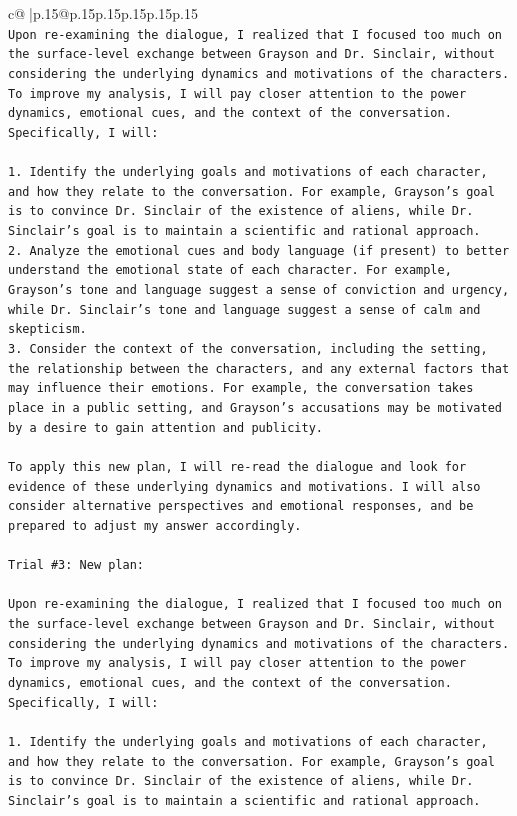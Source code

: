 \documentclass{article}
\begin{document}
{\begin{supertabular}{c@{$\;$}|p{.15\linewidth}@{}p{.15\linewidth}p{.15\linewidth}p{.15\linewidth}p{.15\linewidth}p{.15\linewidth}}
{{{\\ 
\texttt{Upon re{-}examining the dialogue, I realized that I focused too much on the surface{-}level exchange between Grayson and Dr. Sinclair, without considering the underlying dynamics and motivations of the characters. To improve my analysis, I will pay closer attention to the power dynamics, emotional cues, and the context of the conversation. Specifically, I will:} \\
\\ 
\texttt{1. Identify the underlying goals and motivations of each character, and how they relate to the conversation. For example, Grayson's goal is to convince Dr. Sinclair of the existence of aliens, while Dr. Sinclair's goal is to maintain a scientific and rational approach.} \\
\texttt{2. Analyze the emotional cues and body language (if present) to better understand the emotional state of each character. For example, Grayson's tone and language suggest a sense of conviction and urgency, while Dr. Sinclair's tone and language suggest a sense of calm and skepticism.} \\
\texttt{3. Consider the context of the conversation, including the setting, the relationship between the characters, and any external factors that may influence their emotions. For example, the conversation takes place in a public setting, and Grayson's accusations may be motivated by a desire to gain attention and publicity.} \\
\\ 
\texttt{To apply this new plan, I will re{-}read the dialogue and look for evidence of these underlying dynamics and motivations. I will also consider alternative perspectives and emotional responses, and be prepared to adjust my answer accordingly.} \\
\\ 
\texttt{Trial \#3: New plan: } \\
\\ 
\texttt{Upon re{-}examining the dialogue, I realized that I focused too much on the surface{-}level exchange between Grayson and Dr. Sinclair, without considering the underlying dynamics and motivations of the characters. To improve my analysis, I will pay closer attention to the power dynamics, emotional cues, and the context of the conversation. Specifically, I will:} \\
\\ 
\texttt{1. Identify the underlying goals and motivations of each character, and how they relate to the conversation. For example, Grayson's goal is to convince Dr. Sinclair of the existence of aliens, while Dr. Sinclair's goal is to maintain a scientific and rational approach.} \\
}}}
\end{supertabular}}
\end{document}
